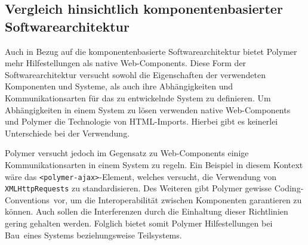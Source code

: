 \subsection{Vergleich hinsichtlich komponentenbasierter Softwarearchitektur}
\label{sec:5_Vergleich_CBA}

Auch in Bezug auf die komponentenbasierte Softwarearchitektur bietet Polymer mehr Hilfestellungen als native Web-Components. Diese Form der Softwarearchitektur versucht sowohl die Eigenschaften der verwendeten Komponenten und Systeme, als auch ihre Abhängigkeiten und Kommunikationsarten für das zu entwickelnde System zu definieren. Um Abhängigkeiten in einem System zu lösen verwenden native Web-Components und Polymer die Technologie von HTML-Imports. Hierbei gibt es keinerlei Unterschiede bei der Verwendung.

Polymer versucht jedoch im Gegensatz zu Web-Components einige Kommunikationsarten in einem System zu regeln. Ein Beispiel in diesem Kontext wäre das \lstinline|<polymer-ajax>|-Element, welches versucht, die Verwendung von \lstinline|XMLHttpRequests| zu standardisieren.
Des Weiteren gibt Polymer gewisse \glqq Coding-Conventions\grqq\ vor, um die Interoperabilität zwischen Komponenten garantieren zu können. Auch sollen die Interferenzen durch die Einhaltung dieser Richtlinien gering gehalten werden. Folglich bietet somit Polymer Hilfestellungen bei \glqq Bau\grqq\ eines Systems beziehungsweise Teilsystems.